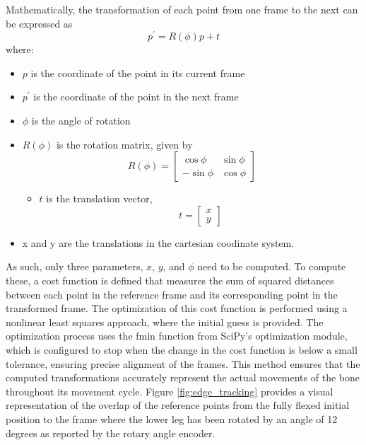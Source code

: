 \documentclass{micro-econ-thesis}
\begin{document}
Mathematically, the transformation of each point from one frame to the next can be expressed as 
\begin{equation}
	p^{'} = R(\phi)p + t
	\label{eq:rot} 
\end{equation}
where: 
\begin{itemize}
	\item \textbf{$p$} is the coordinate of the point in its current frame
	\item \textbf{$p^{'}$} is the coordinate of the point in the next frame
	\item $\phi$ is the angle of rotation
	\item \textbf{$R(\phi)$}  is the rotation matrix, given by 
	 \[
	 R(\phi) = 
	 \begin{bmatrix}
	 	\cos \phi & \sin \phi \\
	 	-\sin \phi & \cos \phi
	 \end{bmatrix}
	 \]
	 \begin{itemize}
	 	\item $t$ is the translation vector,
	 	\[
	 	t = \begin{bmatrix}
	 		x \\
	 		y
	 	\end{bmatrix}
	 	\]
	 \end{itemize}
 	\item x and y are the translations in the cartesian coodinate system. 
\end{itemize}   
As such, only three parameters, $x$, $y$, and $\phi$ need to be computed. To compute these, a cost function is defined that measures the sum of squared distances between each point in the reference frame and its corresponding point in the transformed frame. The optimization of this cost function is performed using a nonlinear least squares approach, where the initial guess is provided. The optimization process uses the fmin function from SciPy’s optimization module, which is configured to stop when the change in the cost function is below a small tolerance, ensuring precise alignment of the frames. This method ensures that the computed transformations accurately represent the actual movements of the bone throughout its movement cycle. Figure \ref{fig:edge_tracking} provides a visual representation of the overlap of the reference points from the fully flexed initial position to the frame where the lower leg has been rotated by an angle of 12 degrees as reported by the rotary angle encoder. 
\end{document}
